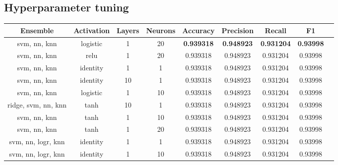 

\begin{appendices}

\section{Hyperparameter tuning}
\label{appendix:Hyperparameters}


\begin{table}[ht]
\begin{subtable}{\textwidth}
\begin{adjustbox}{minipage=18cm, center}
\centering
\begin{tabular*}{\textwidth}{c @{\extracolsep{\fill}} cccccccc}

\toprule
Ensemble     & Activation & Layers        &  Neurons &  Accuracy &  Precision &    Recall &  F1 \\
\midrule
svm, nn, knn &   logistic & 1             &       20 &  \textbf{0.939318} &   \textbf{0.948923} &  \textbf{0.931204} &  \textbf{0.93998} \\
svm, nn, knn &       relu & 1             &       20 &  0.939318 &   0.948923 &  0.931204 &  0.93998 \\
svm, nn, knn &   identity & 1             &        1 &  0.939318 &   0.948923 &  0.931204 &  0.93998 \\
svm, nn, knn &   identity & 10            &        1 &  0.939318 &   0.948923 &  0.931204 &  0.93998 \\
svm, nn, knn &   logistic & 1             &       10 &  0.939318 &   0.948923 &  0.931204 &  0.93998 \\
ridge, svm, nn, knn & tanh & 10           &        1 &  0.939318 &   0.948923 &  0.931204 &  0.93998 \\
svm, nn, knn &       tanh & 1             &       10 &  0.939318 &   0.948923 &  0.931204 &  0.93998 \\
svm, nn, knn &       tanh & 1             &       20 &  0.939318 &   0.948923 &  0.931204 &  0.93998 \\
svm, nn, logr, knn & identity & 1         &        1 &  0.939318 &   0.948923 &  0.931204 &  0.93998 \\
svm, nn, logr, knn & identity & 1         &       10 &  0.939318 &   0.948923 &  0.931204 &  0.93998 \\
\bottomrule


\end{tabular*}
\end{adjustbox}
\end{subtable}
\end{table}
\end{appendices}
